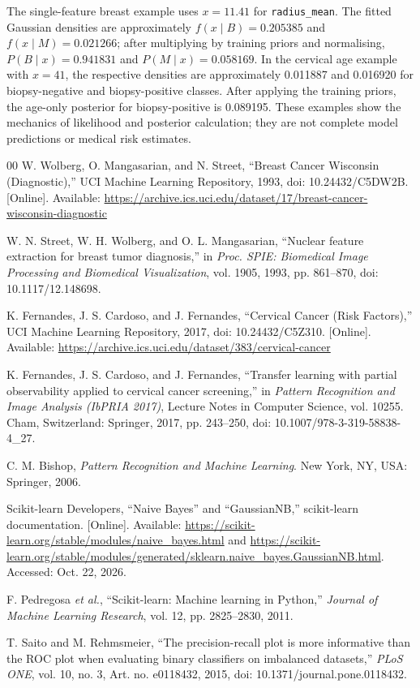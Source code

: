\documentclass[conference]{IEEEtran}
\begin{document}
The single-feature breast example uses $x=11.41$ for \texttt{radius\_mean}. The fitted Gaussian densities are approximately $f(x\mid B)=0.205385$ and $f(x\mid M)=0.021266$; after multiplying by training priors and normalising, $P(B\mid x)=0.941831$ and $P(M\mid x)=0.058169$. In the cervical age example with $x=41$, the respective densities are approximately 0.011887 and 0.016920 for biopsy-negative and biopsy-positive classes. After applying the training priors, the age-only posterior for biopsy-positive is 0.089195. These examples show the mechanics of likelihood and posterior calculation; they are not complete model predictions or medical risk estimates.

\begin{thebibliography}{00}
W. Wolberg, O. Mangasarian, and N. Street, ``Breast Cancer Wisconsin (Diagnostic),'' UCI Machine Learning Repository, 1993, doi: 10.24432/C5DW2B. [Online]. Available: \url{https://archive.ics.uci.edu/dataset/17/breast-cancer-wisconsin-diagnostic}

W. N. Street, W. H. Wolberg, and O. L. Mangasarian, ``Nuclear feature extraction for breast tumor diagnosis,'' in \emph{Proc. SPIE: Biomedical Image Processing and Biomedical Visualization}, vol. 1905, 1993, pp. 861--870, doi: 10.1117/12.148698.

K. Fernandes, J. S. Cardoso, and J. Fernandes, ``Cervical Cancer (Risk Factors),'' UCI Machine Learning Repository, 2017, doi: 10.24432/C5Z310. [Online]. Available: \url{https://archive.ics.uci.edu/dataset/383/cervical-cancer}

K. Fernandes, J. S. Cardoso, and J. Fernandes, ``Transfer learning with partial observability applied to cervical cancer screening,'' in \emph{Pattern Recognition and Image Analysis (IbPRIA 2017)}, Lecture Notes in Computer Science, vol. 10255. Cham, Switzerland: Springer, 2017, pp. 243--250, doi: 10.1007/978-3-319-58838-4\_27.

C. M. Bishop, \emph{Pattern Recognition and Machine Learning}. New York, NY, USA: Springer, 2006.

Scikit-learn Developers, ``Naive Bayes'' and ``GaussianNB,'' scikit-learn documentation. [Online]. Available: \url{https://scikit-learn.org/stable/modules/naive_bayes.html} and \url{https://scikit-learn.org/stable/modules/generated/sklearn.naive_bayes.GaussianNB.html}. Accessed: Oct. 22, 2026.

F. Pedregosa \textit{et al.}, ``Scikit-learn: Machine learning in Python,'' \emph{Journal of Machine Learning Research}, vol. 12, pp. 2825--2830, 2011.

T. Saito and M. Rehmsmeier, ``The precision-recall plot is more informative than the ROC plot when evaluating binary classifiers on imbalanced datasets,'' \emph{PLoS ONE}, vol. 10, no. 3, Art. no. e0118432, 2015, doi: 10.1371/journal.pone.0118432.
\end{thebibliography}
\end{document}
